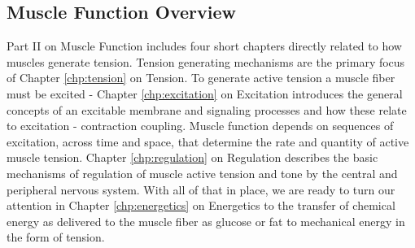 % 
%
%

\begin{partbacktext}
\part{Muscle Function Overview}
\noindent 
Part II on Muscle Function includes four short chapters directly related to how muscles generate tension. Tension generating mechanisms are the primary focus of Chapter \ref{chp:tension} on Tension. To generate active tension a muscle fiber must be excited - Chapter \ref{chp:excitation} on Excitation introduces the general concepts of an excitable membrane and signaling processes and how these relate to excitation - contraction coupling. Muscle function depends on sequences of excitation, across time and space, that determine the rate and quantity of active muscle tension. Chapter \ref{chp:regulation} on Regulation describes the basic mechanisms of regulation of muscle active tension and tone by the central and peripheral nervous system. With all of that in place, we are ready to turn our attention in Chapter \ref{chp:energetics} on Energetics to the transfer of chemical energy as delivered to the muscle fiber as glucose or fat to mechanical energy in the form of tension. 
\end{partbacktext}